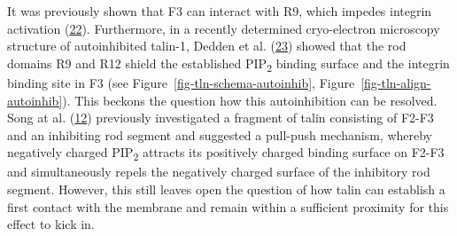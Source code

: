 \documentclass[
  twocolumn]{biophys-new-mod}
\begin{document}
It was previously shown that F3 can interact with R9, which impedes
integrin activation
(\protect\hyperlink{ref-bannoSubcellularLocalizationTalin2012}{22}).
Furthermore, in a recently determined cryo-electron microscopy structure
of autoinhibited talin-1, Dedden et al.
(\protect\hyperlink{ref-deddenArchitectureTalin1Reveals2019a}{23})
showed that the rod domains R9 and R12 shield the established
PIP\textsubscript{2} binding surface and the integrin binding site in F3
(see
Figure~\ref{fig-tln-schema-autoinhib}, Figure~\ref{fig-tln-align-autoinhib}).
This beckons the question how this autoinhibition can be resolved. Song
at al.
(\protect\hyperlink{ref-songNovelMembranedependentSwitch2012a}{12})
previously investigated a fragment of talin consisting of F2-F3 and an
inhibiting rod segment and suggested a pull-push mechanism, whereby
negatively charged PIP\textsubscript{2} attracts its positively charged
binding surface on F2-F3 and simultaneously repels the negatively
charged surface of the inhibitory rod segment. However, this still
leaves open the question of how talin can establish a first contact with
the membrane and remain within a sufficient proximity for this effect to
kick in.
\end{document}
